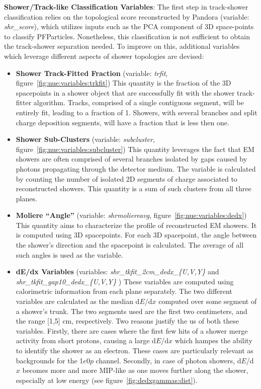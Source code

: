 \par \noindent \textbf{Shower/Track-like  Classification Variables}: The first step in track-shower classification relies on the topological score reconstructed by Pandora (variable: \emph{shr\_score}), which utilizes inputs such as the PCA component of 3D space-points to classify PFParticles. Nonetheless, this classification is not sufficient to obtain the track-shower separation needed. To improve on this, additional variables which leverage different aspects of shower topologies are devised:

\begin{itemize}

    \item[] \textbf{Shower Track-Fitted Fraction} (variable: \emph{trfit}, figure~\ref{fig:nue:variables:trkfit}) This quantity is the fraction of the 3D spacepoints in a shower object that are successfully fit with the shower track-fitter algorithm. Tracks, comprised of a single contiguous segment, will be entirely fit, leading to a fraction of 1. Showers, with several branches and split charge deposition segments, will have a fraction that is less then one.
    \item[] \textbf{Shower Sub-Clusters} (variable: \emph{subcluster}, figure~\ref{fig:nue:variables:subcluster}) This quantity leverages the fact that EM showers are often comprised of several branches isolated by gaps caused by photons propagating through the detector medium. The variable is calculated by counting the number of isolated 2D segments of charge associated to reconstructed showers. This quantity is a sum of such clusters from all three planes.
    \item[] \textbf{Moliere ``Angle''} (variable: \emph{shrmoliereavg}, figure~\ref{fig:nue:variables:dedx}) This quantity aims to characterize the profile of reconstructed EM showers. It is computed using 3D spacepoints. For each 3D spacepoint, the angle between the shower's direction and the spacepoint is calculated. The average of all such angles is used as the variable.
    \item[] \textbf{dE/dx Variables} (variables: \emph{shr\_tkfit\_2cm\_dedx\_\{U,V,Y\}} and \emph{shr\_tkfit\_gap10\_dedx\_\{U,V,Y\}} )  These variables are computed using calorimetric information from each plane separately. The two different variables are calculated as the median d$E$/d$x$ computed over some segment of a shower's trunk. The two segments used are the first two centimeters, and the range [1,5] cm, respectively. Two reasons justify the us of both these variables. Firstly, there are cases where the first few hits of a shower merge activity from short protons, causing a large d$E$/d$x$ which hampes the ability to identify the shower as an electron. These cases are particularly relevant as backgrounds for the 1$e$0$p$ channel. Secondly, in case of photon showers, d$E$/d$x$ becomes more and more MIP-like as one moves further along the shower, especially at low energy (see figure~\ref{fig:dedxgammas:dist}).
\end{itemize}{}

